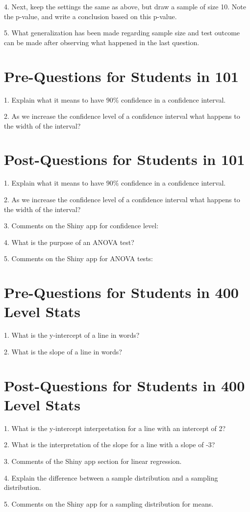 \documentclass[11pt]{amsart}
\begin{document}
4. Next, keep the settings the same as above, but draw a sample of size 10.  Note the p-value, and write a conclusion based on this p-value.  

5.  What generalization has been made regarding sample size and test outcome can be made after observing what happened in the last question.

\newpage



\section{Pre-Questions for Students in 101}

1. Explain what it means to have $90\%$ confidence in a confidence interval.


2. As we increase the confidence level of a confidence interval what happens to the width of the interval?



\section{Post-Questions for Students in 101}

1. Explain what it means to have $90\%$ confidence in a confidence interval.


2. As we increase the confidence level of a confidence interval what happens to the width of the interval?


3. Comments on the Shiny app for confidence level:


4. What is the purpose of an ANOVA test?


5. Comments on the Shiny app for ANOVA tests:




\section{Pre-Questions for Students in 400 Level Stats}

1. What is the y-intercept of a line in words?

2. What is the slope of a line in words?


\section{Post-Questions for Students in 400 Level Stats}

1.  What is the y-intercept interpretation for a line with an intercept of 2?

2. What is the interpretation of the slope for a line with a slope of -3?

3. Comments of the Shiny app section for linear regression.


4. Explain the difference between a sample distribution and a sampling distribution.


5. Comments on the Shiny app for a sampling distribution for means.
\end{document}
